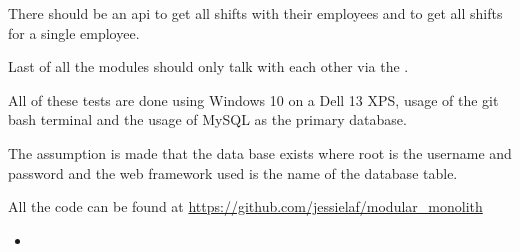There should be an api to get all shifts with their employees and to get all shifts for a single employee.

Last of all the modules should only talk with each other via the .

All of these tests are done using Windows 10 on a Dell 13 XPS, usage of the git bash terminal and the usage of MySQL as the primary database.

The assumption is made that the data base exists where root is the username and password and the web framework used is the name of the database table.

All the code can be found at \url{https://github.com/jessielaf/modular_monolith}

\begin{itemize}
    \item {}
\end{itemize}
